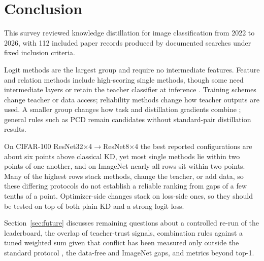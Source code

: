 \section{Conclusion}
\label{sec:conclusion}

This survey reviewed knowledge distillation for image classification from 2022 to 2026, with 112 included paper records produced by documented searches under fixed inclusion criteria.

Logit methods are the largest group and require no intermediate features. Feature and relation methods include high-scoring single methods, though some need intermediate layers or retain the teacher classifier at inference \citep{chen2022simkd}. Training schemes change teacher or data access; reliability methods change how teacher outputs are used. A smaller group changes how task and distillation gradients combine \citep{zhao2023dot,huang2025deepkd,hayder2026dtokd}; general rules such as PCD \citep{varam2026pcd} remain candidates without standard-pair distillation results.

On CIFAR-100 ResNet32$\times$4$\to$ResNet8$\times$4 the best
reported configurations are about six points above classical KD, yet most single methods lie within two
points of one another, and on ImageNet nearly all rows sit within two points. Many of the highest rows stack methods, change the teacher, or add data, so these differing protocols do not establish a reliable ranking from gaps of a few tenths of a point. Optimizer-side changes stack on
loss-side ones, so they should be tested on top of both plain KD and a strong logit loss.

Section~\ref{sec:future} discusses remaining questions about a controlled re-run of the leaderboard, the overlap of teacher-trust signals, combination rules against a tuned
weighted sum \citep{xin2022mtohelp,kurin2022unitary,royer2023scalarization} given that conflict has been measured only outside the standard protocol
\citep{kang2025dho}, the data-free and ImageNet gaps, and metrics beyond top-1.
